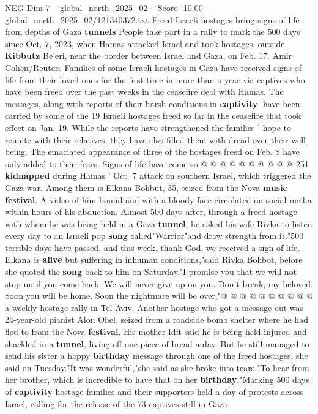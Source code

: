 \begin{textsample}{NEG Dim 7 – global\_north\_2025\_02 – Score -10.00 – global\_north\_2025\_02/121340372.txt}  \label{ex:f7_neg_068}
Freed Israeli hostages bring signs of life from depths of Gaza \textbf{tunnels} People take part in a rally to mark the 500 days since Oct. 7, 2023, when Hamas attacked Israel and took hostages, outside \textbf{Kibbutz} Be'eri, near the border between Israel and Gaza, on Feb. 17.
Amir Cohen/Reuters Families of some Israeli hostages in Gaza have received signs of life from their loved ones for the first time in more than a year via captives who have been freed over the past weeks in the ceasefire deal with Hamas.
The messages, along with reports of their harsh conditions in \textbf{captivity}, have been carried by some of the 19 Israeli hostages freed so far in the ceasefire that took effect on Jan. 19.
While the reports have strengthened the families ' hope to reunite with their relatives, they have also filled them with dread over their well-being.
The emaciated appearance of three of the hostages freed on Feb. 8 have only added to their fears.
Signs of life have come so @ @ @ @ @ @ @ @ @ @ 251 \textbf{kidnapped} during Hamas ' Oct. 7 attack on southern Israel, which triggered the Gaza war.
Among them is Elkana Bohbut, 35, seized from the Nova \textbf{music} \textbf{festival}.
A video of him bound and with a bloody face circulated on social media within hours of his abduction.
Almost 500 days after, through a freed hostage with whom he was being held in a Gaza \textbf{tunnel}, he asked his wife Rivka to listen every day to an Israeli pop \textbf{song} called"Warrior"and draw strength from it."500 terrible days have passed, and this week, thank God, we received a sign of life.
Elkana is \textbf{alive} but suffering in inhuman conditions,"said Rivka Bohbot, before she quoted the \textbf{song} back to him on Saturday."I promise you that we will not stop until you come back.
We will never give up on you.
Don't break, my beloved.
Soon you will be home.
Soon the nightmare will be over,"@ @ @ @ @ @ @ @ @ @ a weekly hostage rally in Tel Aviv.
Another hostage who got a message out was 24-year-old pianist Alon Ohel, seized from a roadside bomb shelter where he had fled to from the Nova \textbf{festival}.
His mother Idit said he is being held injured and shackled in a \textbf{tunnel}, living off one piece of bread a day.
But he still managed to send his sister a happy \textbf{birthday} message through one of the freed hostages, she said on Tuesday."It was wonderful,"she said as she broke into tears."To hear from her brother, which is incredible to have that on her \textbf{birthday}."Marking 500 days of \textbf{captivity} hostage families and their supporters held a day of protests across Israel, calling for the release of the 73 captives still in Gaza.

\end{textsample}
